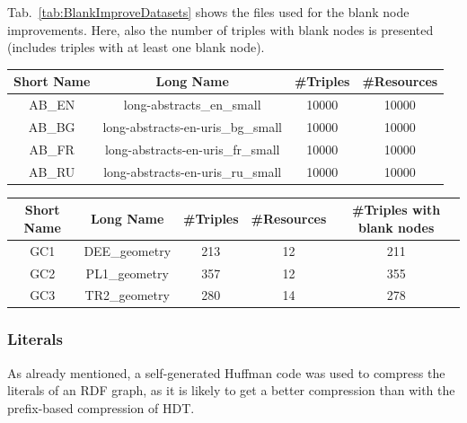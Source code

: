 Tab.~\ref{tab:BlankImproveDatasets} shows the files used for the blank node improvements. Here, also the number of triples with blank nodes is presented (includes triples with at least one blank node).

\begin{center}
	\begin{tabular}{|c|c|c|c|}
		\hline 
		Short Name & Long Name & \#Triples & \#Resources \\ 
		\hline
		AB\_EN & long-abstracts\_en\_small & 10000 & 10000 \\
		\hline
		AB\_BG & long-abstracts-en-uris\_bg\_small & 10000 & 10000  \\
		\hline
		AB\_FR & long-abstracts-en-uris\_fr\_small & 10000 & 10000 \\
		\hline
		AB\_RU & long-abstracts-en-uris\_ru\_small & 10000 & 10000 \\
		\hline
	\end{tabular} 
	\label{tab:HuffImproveDatasets}
\end{center}

\pagebreak
\begin{center}
	\begin{tabular}{|c|c|c|c|c|}
		\hline 
		Short Name & Long Name & \#Triples & \#Resources & \#Triples with blank nodes \\ 
		\hline
		GC1 & DEE\_geometry & 213 & 12 & 211 \\
		\hline
		GC2 & PL1\_geometry & 357 & 12 & 355 \\
		\hline
		GC3 & TR2\_geometry & 280 & 14 & 278 \\
		\hline
	\end{tabular} 
	\label{tab:BlankImproveDatasets}
\end{center}



\subsubsection{Literals}\label{sec:evaluationLiterals}

As already mentioned, a self-generated Huffman code was used to compress the literals of an RDF graph, as it is likely to get a better compression than with the prefix-based compression of HDT.

